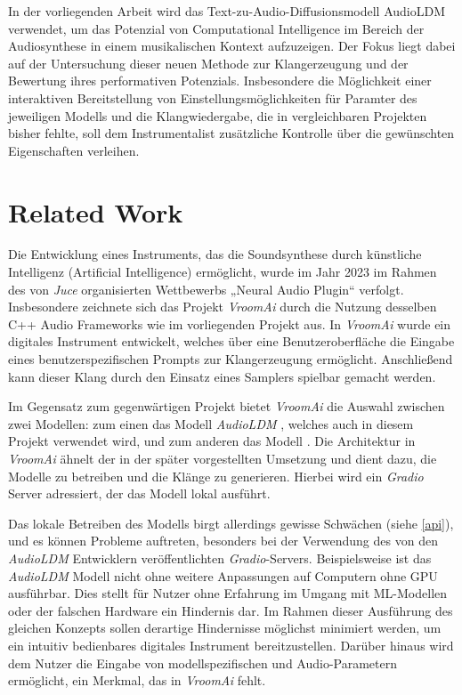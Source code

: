\documentclass[
  a4paper,  %
  twoside,  %
  bibliography=totoc,
  headsepline,
  cleardoublepage=empty,
  parskip=half,
  draft=false
]{scrbook}
\begin{document}
In der vorliegenden Arbeit wird das Text-zu-Audio-Diffusionsmodell \glqq AudioLDM\grqq \cite{liu_audioldm_2023} verwendet, um das Potenzial von Computational Intelligence im Bereich der Audiosynthese in einem musikalischen Kontext aufzuzeigen. Der Fokus liegt dabei auf der Untersuchung dieser neuen Methode zur Klangerzeugung und der Bewertung ihres performativen Potenzials. Insbesondere die Möglichkeit einer interaktiven Bereitstellung von Einstellungsmöglichkeiten für Paramter des jeweiligen Modells und die Klangwiedergabe, die in vergleichbaren Projekten bisher fehlte, soll dem Instrumentalist zusätzliche Kontrolle über die gewünschten Eigenschaften verleihen.


\chapter{Related Work}


Die Entwicklung eines Instruments, das die Soundsynthese durch künstliche Intelligenz (Artificial Intelligence) ermöglicht, wurde im Jahr 2023 im Rahmen des von \emph{Juce} \cite{noauthor_juce_nodate} organisierten Wettbewerbs „Neural Audio Plugin“ verfolgt. Insbesondere zeichnete sich das Projekt \emph{VroomAi} \cite{barney_hill_vroomai_2023} durch die Nutzung desselben C++ Audio Frameworks wie im vorliegenden Projekt aus. In \emph{VroomAi} wurde ein digitales Instrument entwickelt, welches über eine Benutzeroberfläche die Eingabe eines benutzerspezifischen Prompts zur Klangerzeugung ermöglicht. Anschließend kann dieser Klang durch den Einsatz eines Samplers spielbar gemacht werden.

Im Gegensatz zum gegenwärtigen Projekt bietet \emph{VroomAi} die Auswahl zwischen zwei Modellen: zum einen das Modell \emph{AudioLDM} \cite{liu_audioldm_2023}, welches auch in diesem Projekt verwendet wird, und zum anderen das Modell \cite{borsos_audiolm_2022}. Die Architektur in \emph{VroomAi} ähnelt der in der später vorgestellten Umsetzung und dient dazu, die Modelle zu betreiben und die Klänge zu generieren. Hierbei wird ein \emph{Gradio} Server \cite{team_gradio_gradio_nodate} adressiert, der das Modell lokal ausführt.

Das lokale Betreiben des Modells birgt allerdings gewisse Schwächen (siehe \ref{api}), und es können Probleme auftreten, besonders bei der Verwendung des von den \emph{AudioLDM} Entwicklern veröffentlichten \emph{Gradio}-Servers. Beispielsweise ist das \emph{AudioLDM} Modell nicht ohne weitere Anpassungen auf Computern ohne GPU ausführbar. Dies stellt für Nutzer ohne Erfahrung im Umgang mit ML-Modellen oder der falschen Hardware ein Hindernis dar. Im Rahmen dieser Ausführung des gleichen Konzepts sollen derartige Hindernisse möglichst minimiert werden, um ein intuitiv bedienbares digitales Instrument bereitzustellen. Darüber hinaus wird dem Nutzer die Eingabe von modellspezifischen und Audio-Parametern ermöglicht, ein Merkmal, das in \emph{VroomAi} fehlt.
\end{document}
